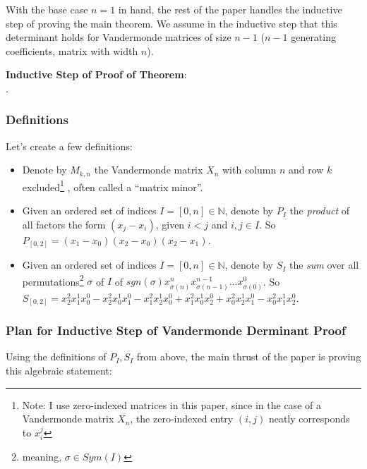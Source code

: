 \documentclass[11pt, oneside]{article} 	%
\begin{document}
With the base case $n=1$ in hand, the rest of the paper handles the inductive step of proving the main theorem.  We assume in the inductive step that this determinant holds for Vandermonde matrices of size $n-1$ ($n-1$ generating coefficients, matrix with width $n$).

\textbf{Inductive Step of Proof of Theorem}:
\\

.

\subsubsection{Definitions} 

Let's create a few definitions: 
\begin{itemize}
\item Denote by $M_{k,n}$ the Vandermonde matrix  $X_n$ with column $n$ and row $k$ excluded\footnote{Note: I use zero-indexed matrices in this paper, since in the case of a Vandermonde matrix $X_n$, the zero-indexed entry $(i, j)$ neatly corresponds to $x_i^j$} , often called a ``matrix minor''.  
\item Given an ordered set of indices $I = [0, n]\in\mathbb{N}$, denote by $P_I$ the \emph{product} of all factors the form $(x_j - x_i)$, given $i < j$ and $i, j \in I$.  So $P_{[0,2]} = (x_1 - x_0)(x_2-x_0)(x_2- x_1)$.
\item Given an ordered set of indices $I = [0, n]\in\mathbb{N}$, denote by $S_I$ the \emph{sum} over all permutations\footnote{meaning, $\sigma \in Sym(I)$} $\sigma$  of $I$ of $sgn(\sigma) x_{\sigma(n)}^{n} x_{\sigma(n-1)}^{n-1} ... x_{\sigma(0)}^{0} $. So $S_{[0,2]} = x_2^2x_1^1x_0^0 - x_2^2x_0^1x_1^0 - x_1^2x_2^1x_0^0 + x_1^2x_0^1x_2^0 + x_0^2x_2^1x_1^0 - x_0^2x_1^1x_2^0$.
\end{itemize}

\subsubsection{Plan for Inductive Step of Vandermonde Derminant Proof} 

Using the definitions of $P_I, S_I$ from above, the main thrust of the paper is proving this algebraic statement:

\end{document}

